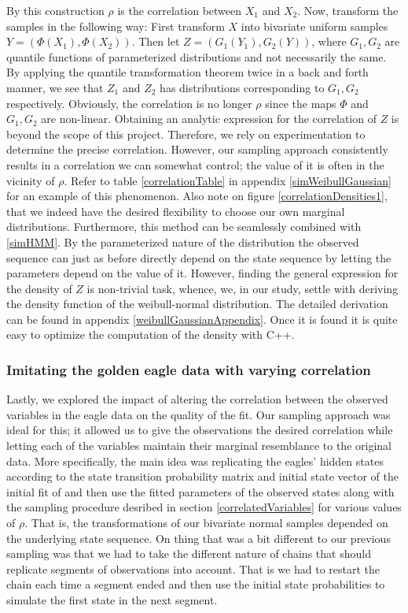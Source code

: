 By this construction $\rho$ is the correlation between $X_1$ and $X_2$. Now, transform the samples in the following way: First transform $X$ into bivariate uniform samples $Y = (\Phi(X_1),\Phi(X_2))$. Then let $Z = (G_1(Y_1), G_2(Y))$, where $G_1, G_2$ are quantile functions of parameterized distributions and not necessarily the same. By applying the quantile transformation theorem twice in a back and forth manner, we see that $Z_1$ and $Z_2$ has distributions corresponding to $G_1, G_2$ respectively. Obviously, the correlation is no longer $\rho$ since the maps $\Phi$ and $G_1, G_2$ are non-linear. Obtaining an analytic expression for the correlation of $Z$ is beyond the scope of this project. Therefore, we rely on experimentation to determine the precise correlation. However, our sampling approach consistently results in a correlation we can somewhat control; the value of it is often in the vicinity of $\rho$. Refer to table \ref{correlationTable} in appendix \ref{simWeibullGaussian} for an example of this phenomenon. Also note on figure \ref{correlationDensities1}, that we indeed have the desired flexibility to choose our own marginal distributions. Furthermore, this method can be seamlessly combined with \ref{simHMM}. By the parameterized nature of the distribution the observed sequence can just as before directly depend on the state sequence by letting the parameters depend on the value of it. However, finding the general expression for the density of $Z$ is non-trivial task, whence, we, in our study, settle with deriving the density function of the weibull-normal distribution. The detailed derivation can be found in appendix \ref{weibullGaussianAppendix}. Once it is found it is quite easy to optimize the computation of the density with C++\cite{Rcpp}.
\subsubsection{Imitating the golden eagle data with varying correlation}\label{eagleImitation}
Lastly, we explored the impact  of altering the correlation between the observed variables in the eagle data on the quality of the fit. Our sampling approach was ideal for this; it allowed us to give the observations the desired correlation while letting each of the variables maintain their marginal resemblance to the original data. More specifically, the main idea was replicating the eagles' hidden  states according to the state transition probability matrix and initial state vector of the initial fit of and then use the fitted parameters of the observed states along with the sampling procedure desribed in section \ref{correlatedVariables} for various values of $\rho$. That is, the transformations of our bivariate normal samples depended on the underlying state sequence. On thing that was a bit different to our previous sampling was that we had to take the different nature of chains that should replicate segments of observations into account. That is we had to restart the chain each time a segment ended and then use the initial state probabilities to simulate the first state in the next segment.